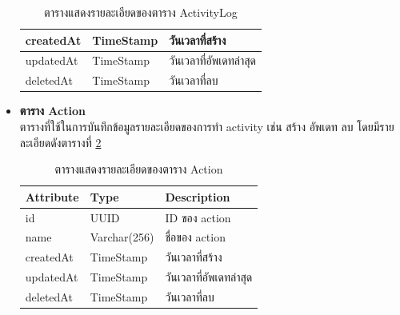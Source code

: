 \documentclass[12pt,oneside,openright,a4paper]{cpe-thai-project}
\begin{document}
\begin{itemize}
\begin{table}[!ht]
\begin{tabular}{|p{4cm}|p{2cm}|p{6cm}|}
    createdAt & TimeStamp & วันเวลาที่สร้าง                     \\ \hline
    updatedAt & TimeStamp & วันเวลาที่อัพเดทล่าสุด              \\ \hline
    deletedAt & TimeStamp & วันเวลาที่ลบ                      \\ \hline
    \end{tabular}
    \caption{\centering  ตารางแสดงรายละเอียดของตาราง ActivityLog} \label{tbl:dbActivityLog}
\end{table}
\item \textbf{ตาราง Action}\\
ตารางที่ใช้ในการบันทึกข้อมูลรายละเอียดของการทำ activity เช่น สร้าง อัพเดท ลบ โดยมีรายละเอียดดังตารางที่ \ref{tbl:dbAction}
\begin{table}[!ht]
    \centering
    \begin{tabular}{|p{4cm}|p{2cm}|p{6cm}|}
    \hline
    \textbf{Attribute} & \textbf{Type} & \textbf{Description}   \\ \hline
    id        & UUID        & ID ของ action          \\ \hline
    name      & Varchar(256) & ชื่อของ action         \\ \hline
    createdAt & TimeStamp   & วันเวลาที่สร้าง        \\ \hline
    updatedAt & TimeStamp   & วันเวลาที่อัพเดทล่าสุด \\ \hline
    deletedAt & TimeStamp   & วันเวลาที่ลบ          \\ \hline    
    \end{tabular}
    \caption{\centering  ตารางแสดงรายละเอียดของตาราง Action} \label{tbl:dbAction}
\end{table}


\end{itemize}
\end{document}
